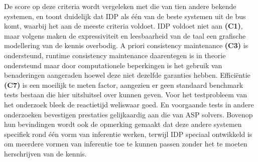 De score op deze criteria wordt vergeleken met die van tien andere bekende systemen, en toont duidelijk dat IDP als \'{e}\'{e}n van de beste systemen uit de bus komt, waarbij het aan de meeste criteria voldoet. IDP voldoet niet aan \textbf{(C1)}, maar volgens \citep{van2016kb} maken de expressiviteit en leesbaarheid van de taal een grafische modellering van de kennis overbodig. 
A priori consistency maintenance \textbf{(C3)} is ondersteund, runtime consistency maintenance daarentegen is in theorie ondersteund maar door computationele beperkingen is het gebruik van benaderingen aangeraden hoewel deze niet dezelfde garanties hebben.
Effici\"{e}ntie \textbf{(C7)} is een moeilijk te meten factor, aangezien er geen standaard benchmark tests bestaan die hier uitsluitsel over kunnen geven. Voor het testprobleem van het onderzoek bleek de reactietijd weliswaar goed. En voorgaande tests in andere onderzoeken bevestigen prestaties gelijkaardig aan die van ASP solvers. 
Bovenop hun bevindingen wordt ook de opmerking gemaakt dat deze andere systemen specifiek rond \'{e}\'{e}n vorm van inferentie werken, terwijl IDP speciaal ontwikkeld is om meerdere vormen van inferentie toe te kunnen passen zonder het te moeten herschrijven van de kennis.

